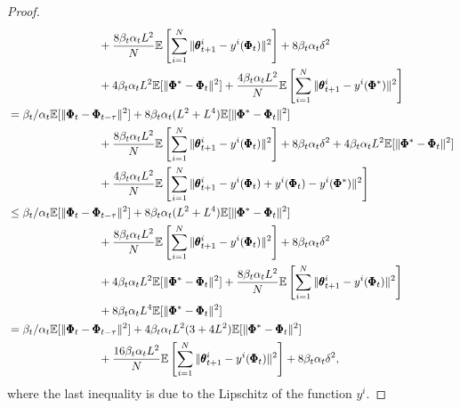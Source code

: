 \documentclass[10pt,a4paper]{amsart}
\begin{document}
\begin{proof}
\begin{align*}
     &\qquad\qquad\qquad\qquad+\frac{8\beta_t
     \alpha_t L^2}{N}\mathbb{E}\left[\sum_{i=1}^N\|\pmb{\theta}_{t+1}^i-y^i(\pmb{\Phi}_t)\|^2\right]+8\beta_t\alpha_t\delta^2\allowdisplaybreaks\\
     &\qquad\qquad\qquad\qquad +4\beta_t\alpha_t L^2 \mathbb{E}[\|\pmb{\Phi}^*-\pmb{\Phi}_t\|^2]+\frac{4\beta_t\alpha_t L^2}{N}\mathbb{E}\left[\sum_{i=1}^N\|\pmb{\theta}^i_{t+1}-y^i(\pmb{\Phi}^*)\|^2\right]\allowdisplaybreaks\\
     & = \beta_t/\alpha_t\mathbb{E}[\|\pmb{\Phi}_t-\pmb{\Phi}_{t-\tau}\|^2] +8\beta_t \alpha_t (L^2+L^4)\mathbb{E}[\|\pmb{\Phi}^*-\pmb{\Phi}_t\|^2]\nonumber\allowdisplaybreaks\\
     &\qquad\qquad\qquad\qquad+\frac{8\beta_t
     \alpha_t L^2}{N}\mathbb{E}\left[\sum_{i=1}^N\|\pmb{\theta}_{t+1}^i-y^i(\pmb{\Phi}_t)\|^2\right]+8\beta_t\alpha_t\delta^2+4\beta_t\alpha_t L^2 \mathbb{E}[\|\pmb{\Phi}^*-\pmb{\Phi}_t\|^2]\allowdisplaybreaks\\
     &\qquad\qquad\qquad\qquad +\frac{4\beta_t\alpha_t L^2}{N}\mathbb{E}\left[\sum_{i=1}^N\|\pmb{\theta}^i_{t+1}-y^i(\pmb{\Phi}_t)+y^i(\pmb{\Phi}_t)-y^i(\pmb{\Phi}^*)\|^2\right]\allowdisplaybreaks\\
     &\leq \beta_t/\alpha_t\mathbb{E}[\|\pmb{\Phi}_t-\pmb{\Phi}_{t-\tau}\|^2] +8\beta_t \alpha_t (L^2+L^4)\mathbb{E}[\|\pmb{\Phi}^*-\pmb{\Phi}_t\|^2]\nonumber\allowdisplaybreaks\\
     &\qquad\qquad\qquad\qquad+\frac{8\beta_t
     \alpha_t L^2}{N}\mathbb{E}\left[\sum_{i=1}^N\|\pmb{\theta}_{t+1}^i-y^i(\pmb{\Phi}_t)\|^2\right]+8\beta_t\alpha_t\delta^2\allowdisplaybreaks\\
     &\qquad\qquad\qquad\qquad+4\beta_t\alpha_t L^2 \mathbb{E}[\|\pmb{\Phi}^*-\pmb{\Phi}_t\|^2]+\frac{8\beta_t\alpha_t L^2}{N}\mathbb{E}\left[\sum_{i=1}^N\|\pmb{\theta}^i_{t+1}-y^i(\pmb{\Phi}_t)\|^2\right]\allowdisplaybreaks\\
     &\qquad\qquad\qquad\qquad+8\beta_t\alpha_tL^4\mathbb{E}[\|\pmb{\Phi}^*-\pmb{\Phi}_t\|^2]\allowdisplaybreaks\\
     &=\beta_t/\alpha_t\mathbb{E}[\|\pmb{\Phi}_t-\pmb{\Phi}_{t-\tau}\|^2] +4\beta_t \alpha_tL^2 (3+4L^2)\mathbb{E}[\|\pmb{\Phi}^*-\pmb{\Phi}_t\|^2]\nonumber\allowdisplaybreaks\\
     &\qquad\qquad\qquad\qquad+\frac{16\beta_t
     \alpha_t L^2}{N}\mathbb{E}\left[\sum_{i=1}^N\|\pmb{\theta}_{t+1}^i-y^i(\pmb{\Phi}_t)\|^2\right]+8\beta_t\alpha_t\delta^2,
\end{align*}
where the last inequality is due to the Lipschitz of the function $y^i$.


\end{proof}
\end{document}

